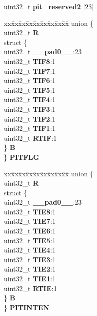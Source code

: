 \begin{DoxyCompactItemize}
\begin{tabbing}
\end{tabbing}\item 
\mbox{\label{structPIT__tag_a287c8ed9b45ca23505bb9e6f1d0f3e01}} 
uint32\+\_\+t {\bfseries pit\+\_\+reserved2} \mbox{[}23\mbox{]}
\item 
\mbox{\label{structPIT__tag_aff7972555c5e706a4d4943752e804549}} 
\begin{tabbing}
xx\=xx\=xx\=xx\=xx\=xx\=xx\=xx\=xx\=\kill
union \{\\
\>uint32\_t {\bfseries R}\\
\>struct \{\\
\>\>uint32\_t {\bfseries \_\_pad0\_\_}:23\\
\>\>uint32\_t {\bfseries TIF8}:1\\
\>\>uint32\_t {\bfseries TIF7}:1\\
\>\>uint32\_t {\bfseries TIF6}:1\\
\>\>uint32\_t {\bfseries TIF5}:1\\
\>\>uint32\_t {\bfseries TIF4}:1\\
\>\>uint32\_t {\bfseries TIF3}:1\\
\>\>uint32\_t {\bfseries TIF2}:1\\
\>\>uint32\_t {\bfseries TIF1}:1\\
\>\>uint32\_t {\bfseries RTIF}:1\\
\>\} {\bfseries B}\\
\} {\bfseries PITFLG}\\

\end{tabbing}\item 
\mbox{\label{structPIT__tag_adcf4c7488b752cc361426638c6f78c54}} 
\begin{tabbing}
xx\=xx\=xx\=xx\=xx\=xx\=xx\=xx\=xx\=\kill
union \{\\
\>uint32\_t {\bfseries R}\\
\>struct \{\\
\>\>uint32\_t {\bfseries \_\_pad0\_\_}:23\\
\>\>uint32\_t {\bfseries TIE8}:1\\
\>\>uint32\_t {\bfseries TIE7}:1\\
\>\>uint32\_t {\bfseries TIE6}:1\\
\>\>uint32\_t {\bfseries TIE5}:1\\
\>\>uint32\_t {\bfseries TIE4}:1\\
\>\>uint32\_t {\bfseries TIE3}:1\\
\>\>uint32\_t {\bfseries TIE2}:1\\
\>\>uint32\_t {\bfseries TIE1}:1\\
\>\>uint32\_t {\bfseries RTIE}:1\\
\>\} {\bfseries B}\\
\} {\bfseries PITINTEN}\\


\end{tabbing}
\end{DoxyCompactItemize}
